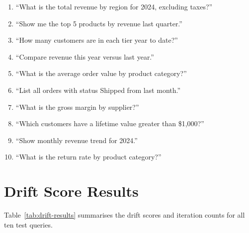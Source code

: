 \documentclass[12pt,a4paper]{report}
\begin{document}
\begin{enumerate}[leftmargin=2em,label=\arabic*.]
  \item ``What is the total revenue by region for 2024, excluding taxes?''
  \item ``Show me the top 5 products by revenue last quarter.''
  \item ``How many customers are in each tier year to date?''
  \item ``Compare revenue this year versus last year.''
  \item ``What is the average order value by product category?''
  \item ``List all orders with status Shipped from last month.''
  \item ``What is the gross margin by supplier?''
  \item ``Which customers have a lifetime value greater than \$1,000?''
  \item ``Show monthly revenue trend for 2024.''
  \item ``What is the return rate by product category?''
\end{enumerate}

\section{Drift Score Results}
\label{sec:drift-results}

Table~\ref{tab:drift-results} summarises the drift scores and iteration counts for all ten test queries.
\end{document}
